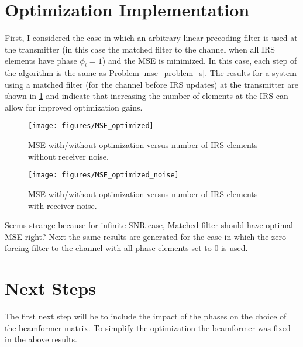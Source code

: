 \documentclass[12pt,a4paper]{report}
\begin{document}
\section{Optimization Implementation}
	First, I considered the case in which an arbitrary linear precoding filter is used at the transmitter (in this case the matched filter to the channel when all IRS elements have phase $\phi_i = 1 $) and the MSE is minimized.
	In this case, each step of the algorithm is the same as Problem \eqref{mse_problem_s}.
	The results for a system using a matched filter (for the channel before IRS updates) at the transmitter are shown in \ref{MSE_opt} and indicate that increasing the number of elements at the IRS 
	can allow for improved optimization gains. 
	\begin{figure}[H]
	\texttt{[image: figures/MSE\_optimized]}
	  \caption{MSE with/without optimization versus number of IRS elements without receiver noise.}
	  	  \label{MSE_opt}
	\end{figure}
		
	\begin{figure}[H]
	\texttt{[image: figures/MSE\_optimized\_noise]}
	  \caption{MSE with/without optimization versus number of IRS elements with receiver noise.}
	  	  \label{MSE_opt_noise}
	\end{figure}
Seems strange because for infinite SNR case, Matched filter should have optimal MSE right?
Next the same results are generated for the case in which the zero-forcing filter to the channel with all phase elements set to 0 is used. 
\section{Next Steps}
The first next step will be to include the impact of the phases on the choice of the beamformer matrix. To simplify the optimization the beamformer was fixed in the above results. 

\end{document}
